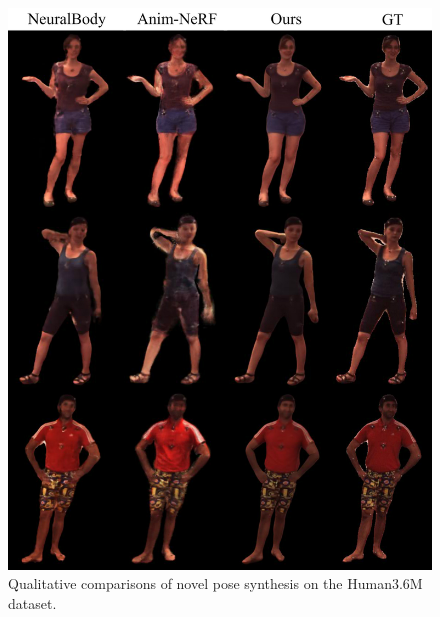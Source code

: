 \begin{figure}[t]
\begin{center}
   \includegraphics[width=1.0\linewidth]{./fig/h36m.jpg}
\end{center}
\caption{Qualitative comparisons of novel pose synthesis on the Human3.6M dataset.}
\label{fig:h36m}
\end{figure}

